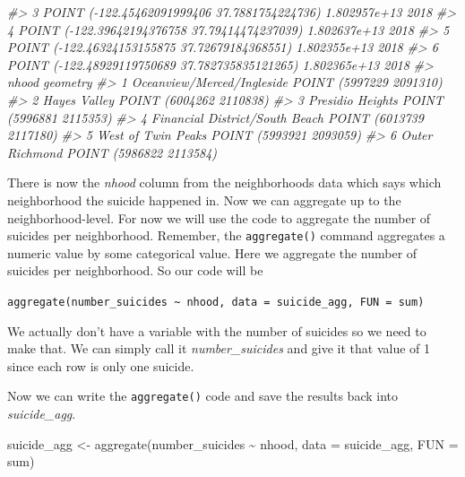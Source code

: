 \documentclass[
  12pt,
]{book}
\newenvironment{Shaded}{\begin{snugshade}}{\end{snugshade}}
\newcommand{\AttributeTok}[1]{\textcolor[rgb]{0.61,0.61,0.61}{#1}}
\newcommand{\CommentTok}[1]{\textcolor[rgb]{0.37,0.37,0.37}{\textit{#1}}}
\newcommand{\DecValTok}[1]{\textcolor[rgb]{0.06,0.06,0.06}{#1}}
\newcommand{\FunctionTok}[1]{\textcolor[rgb]{0,0,0}{#1}}
\newcommand{\NormalTok}[1]{#1}
\newcommand{\OtherTok}[1]{\textcolor[rgb]{0.37,0.37,0.37}{#1}}
\newcommand{\SpecialCharTok}[1]{\textcolor[rgb]{0,0,0}{#1}}
\begin{document}
\begin{Shaded}
\begin{Highlighting}[]
\CommentTok{\#\textgreater{} 3   POINT ({-}122.45462091999406 37.7881754224736) 1.802957e+13 2018}
\CommentTok{\#\textgreater{} 4  POINT ({-}122.39642194376758 37.79414474237039) 1.802637e+13 2018}
\CommentTok{\#\textgreater{} 5  POINT ({-}122.46324153155875 37.72679184368551) 1.802355e+13 2018}
\CommentTok{\#\textgreater{} 6 POINT ({-}122.48929119750689 37.782735835121265) 1.802365e+13 2018}
\CommentTok{\#\textgreater{}                            nhood                geometry}
\CommentTok{\#\textgreater{} 1     Oceanview/Merced/Ingleside POINT (5997229 2091310)}
\CommentTok{\#\textgreater{} 2                   Hayes Valley POINT (6004262 2110838)}
\CommentTok{\#\textgreater{} 3               Presidio Heights POINT (5996881 2115353)}
\CommentTok{\#\textgreater{} 4 Financial District/South Beach POINT (6013739 2117180)}
\CommentTok{\#\textgreater{} 5             West of Twin Peaks POINT (5993921 2093059)}
\CommentTok{\#\textgreater{} 6                 Outer Richmond POINT (5986822 2113584)}
\end{Highlighting}
\end{Shaded}

There is now the \emph{nhood} column from the neighborhoods data which says which neighborhood the suicide happened in. Now we can aggregate up to the neighborhood-level.
For now we will use the code to aggregate the number of suicides per neighborhood. Remember, the \texttt{aggregate()} command aggregates a numeric value by some categorical value. Here we aggregate the number of suicides per neighborhood. So our code will be

\texttt{aggregate(number\_suicides\ \textasciitilde{}\ nhood,\ data\ =\ suicide\_agg,\ FUN\ =\ sum)}

We actually don't have a variable with the number of suicides so we need to make that. We can simply call it \emph{number\_suicides} and give it that value of 1 since each row is only one suicide.

\begin{Shaded}
\end{Shaded}

Now we can write the \texttt{aggregate()} code and save the results back into \emph{suicide\_agg}.

\begin{Shaded}
\begin{Highlighting}[]
\NormalTok{suicide\_agg }\OtherTok{\textless{}{-}} \FunctionTok{aggregate}\NormalTok{(number\_suicides }\SpecialCharTok{\textasciitilde{}}\NormalTok{ nhood, }\AttributeTok{data =}\NormalTok{ suicide\_agg, }\AttributeTok{FUN =}\NormalTok{ sum)}
\end{Highlighting}
\end{Shaded}
\end{document}
